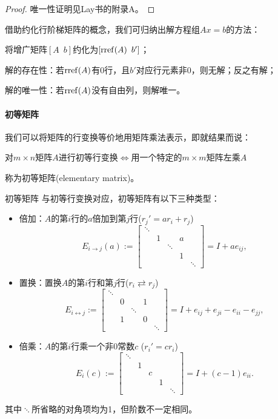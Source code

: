 \begin{proof}
	唯一性证明见Lay书的附录A。
\end{proof}

\begin{remark}
	借助约化行阶梯矩阵的概念，我们可归纳出解方程组$Ax=b$的方法：
	\begin{compactitem}
		\item 将增广矩阵$[A\enspace b]$约化为$[\operatorname{rref}(A)\enspace b']$；
		\item 解的存在性：若$\operatorname{rref}(A)$有0行，且$b'$对应行元素非0，则无解；反之有解；
		\item 解的唯一性：若$\operatorname{rref}(A)$没有自由列，则解唯一。
	\end{compactitem}
\end{remark}

\paragraph{初等矩阵}

我们可以将矩阵的行变换等价地用矩阵乘法表示，即就结果而说：
\begin{center}
	对$m\times n$矩阵$A$进行初等行变换$\iff$用一个特定的$m\times m$矩阵左乘$A$
\end{center}
称为初等矩阵(elementary matrix)。

\begin{definition}
	{初等矩阵}{}
	与初等行变换对应，初等矩阵有以下三种类型：
	\begin{itemize}
		\item 倍加：$A$的第$i$行的$a$倍加到第$j$行($r_j'=ar_i+r_j$)
		\[
			E_{i\to j}(a):=
			\begin{bmatrix}
				\ddots\\ &1&&a\\ &&\ddots\\ &&&1\\ &&&&\ddots
			\end{bmatrix}=I+ae_{ij},
		\]
		\item 置换：置换$A$的第$i$行和第$j$行($r_i\rightleftarrows r_j$)
		\[
			E_{i\leftrightarrow j}:=
			\begin{bmatrix}
				\ddots\\ &0&&1\\ &&\ddots\\ &1&&0\\ &&&&\ddots
			\end{bmatrix}=I+e_{ij}+e_{ji}-e_{ii}-e_{jj},
		\]
		\item 倍乘：$A$的第$i$行乘一个非0常数$c$ ($r_i'=cr_i$)
		\[
			E_i(c):=
			\begin{bmatrix}
				\ddots\\ &1\\ &&c\\ &&&1\\ &&&&\ddots
			\end{bmatrix}=I+(c-1)e_{ii}.
		\]
	\end{itemize}
	其中$\ddots$所省略的对角项均为1，但阶数不一定相同。
\end{definition}

